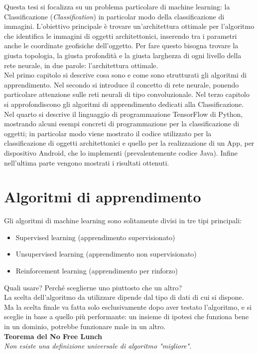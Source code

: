 \documentclass[a4paper,12pt,oneside]{book}
\begin{document}
Questa tesi si focalizza su un problema particolare di machine learning: la Classificazione (\textit{Classification}) in particolar modo della classificazione di immagini. L'obiettivo principale \`e trovare un'architettura ottimale per l'algoritmo che identifica le immagini di oggetti architettonici, inserendo tra i parametri anche le coordinate geofisiche dell'oggetto. Per fare questo bisogna trovare la giusta topologia, la giusta profondit\`{a} e la giusta larghezza di ogni livello della rete neurale, in due parole: l'architettura ottimale.\\
Nel primo capitolo si descrive cosa sono e come sono strutturati gli algoritmi di apprendimento. Nel secondo si introduce il concetto di rete neurale, ponendo particolare attenzione sulle reti neurali di tipo convoluzionale. Nel terzo capitolo si approfondiscono gli algoritmi di apprendimento dedicati alla Classificazione. Nel quarto si descrive il linguaggio di programmazione TensorFlow di Python, mostrando alcuni esempi concreti di programmazione per la classificazione di oggetti; in particolar modo viene mostrato il codice utilizzato per la classificazione di oggetti architettonici e quello per la realizzazione di un App, per dispositivo Android, che lo implementi (prevalentemente codice Java). Infine nell'ultima parte vengono mostrati i risultati ottenuti.
 
\chapter{Algoritmi di apprendimento}
Gli algoritmi di machine learning sono solitamente divisi in tre tipi principali:
\begin{itemize}
\item Supervised learning (apprendimento supervisionato)
\item Unsupervised learning (apprendimento non supervisionato)
\item Reinforcement learning (apprendimento per rinforzo)
\end{itemize}
Quali usare? Perch\'{e} sceglierne uno piuttosto che un altro?\\
La scelta dell'algoritmo da utilizzare dipende dal tipo di dati di cui si dispone. Ma la scelta finale va fatta solo esclusivamente dopo aver testato l'algoritmo, e si sceglie in base a quello pi\`{u} performante: un insieme di ipotesi che funziona bene in un dominio, potrebbe funzionare male in un altro.\\
\textbf{Teorema del No Free Lunch \cite[Wolper,1996]{NFL}}\\
\textit{Non esiste una definizione universale di algoritmo "migliore".}
\end{document}
